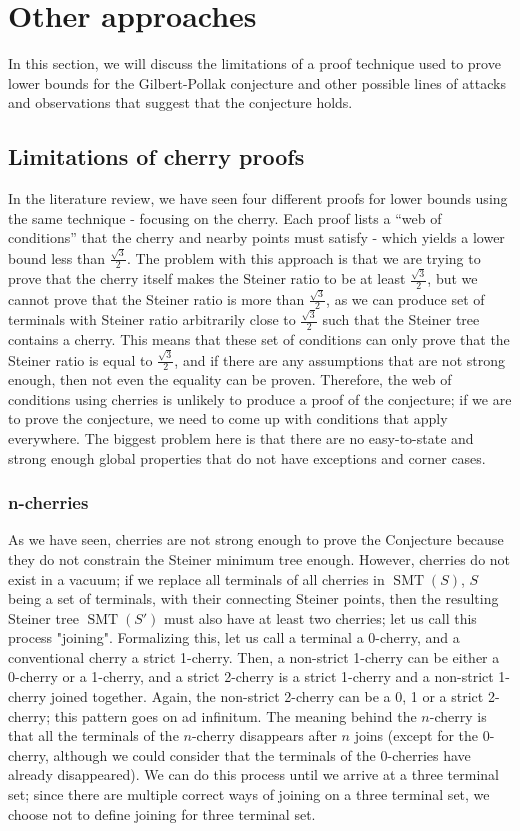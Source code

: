 \documentclass{mpaper}
\begin{document}
\section{Other approaches} \label{sec:other}
In this section, we will discuss the limitations of a proof technique used to prove lower bounds for the Gilbert-Pollak conjecture and other possible lines of attacks and observations that suggest that the conjecture holds. 
\subsection{Limitations of cherry proofs}

In the literature review, we have seen four different proofs for lower bounds using the same technique - focusing on the cherry. Each proof lists a ``web of conditions'' that the cherry and nearby points must satisfy - which yields a lower bound less than $\frac{\sqrt{3}}{2}$. The problem with this approach is that we are trying to prove that the cherry itself makes the Steiner ratio to be at least $\frac{\sqrt{3}}{2}$, but we cannot prove that the Steiner ratio is more than  $\frac{\sqrt{3}}{2}$, as we can produce set of terminals with Steiner ratio arbitrarily close to $\frac{\sqrt{3}}{2}$ such that the Steiner tree contains a cherry. This means that  these set of conditions can only prove that the Steiner ratio is equal to  $\frac{\sqrt{3}}{2}$, and if there are any assumptions that are not strong enough, then not even the equality can be proven. Therefore, the web of conditions using cherries is unlikely to produce a proof of the conjecture; if we are to prove the conjecture, we need to come up with conditions that apply everywhere. The biggest problem here is that there are no easy-to-state and strong enough global properties that do not have exceptions and corner cases.

\subsubsection{n-cherries}
As we have seen, cherries are not strong enough to prove the Conjecture because they do not constrain the Steiner minimum tree enough. However, cherries do not exist in a vacuum; if we replace all terminals of all cherries in $\operatorname{SMT}(S)$, $S$ being a set of terminals, with their connecting Steiner points, then the resulting Steiner tree $\operatorname{SMT}(S')$ must also have at least two cherries; let us call this process "joining". Formalizing this, let us call a terminal a 0-cherry, and a conventional cherry a strict 1-cherry. Then, a non-strict 1-cherry can be either a 0-cherry or a 1-cherry, and a strict 2-cherry is a strict 1-cherry and a non-strict 1-cherry joined together. Again, the non-strict 2-cherry can be a 0, 1 or a strict 2-cherry; this pattern goes on ad infinitum. The meaning behind the $n$-cherry is that all the terminals of the $n$-cherry disappears after $n$ joins (except for the 0-cherry, although we could consider that the terminals of the 0-cherries have already disappeared). We can do this process until we arrive at a three terminal set; since there are multiple correct ways of joining on a three terminal set, we choose not to define joining for three terminal set.
\end{document}
